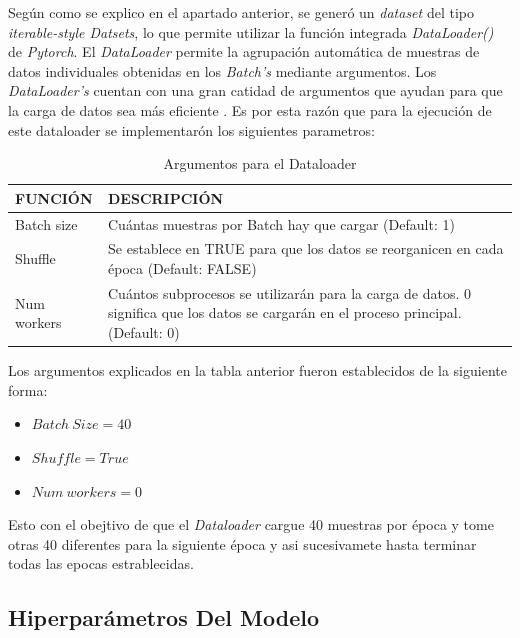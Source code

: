 			Según como se explico en el apartado anterior, se generó un \textit{dataset} del tipo \textit{iterable-style Datsets}, lo que permite utilizar la función integrada \textit{DataLoader()} de \textit{Pytorch}. El \textit{DataLoader} permite la agrupación automática de muestras de datos individuales obtenidas en los \textit{Batch's} mediante argumentos. Los \textit{DataLoader's} cuentan con una gran catidad de argumentos que ayudan para que la carga de datos sea más eficiente \cite{Pytorch}. Es por esta razón que para la ejecución de este dataloader se implementarón los siguientes parametros:
			
			\begin{table}[ht]
				\centering
				\begin{tabular}{|p{3cm}|p{8cm}|}
					\hline
					FUNCIÓN & DESCRIPCIÓN \\ 
					\hline
					Batch size & Cuántas muestras por Batch hay que cargar (Default: 1)\\
					\hline
					Shuffle & Se establece en TRUE para que los datos se reorganicen en cada época (Default: FALSE)  \\
					\hline
					Num workers & Cuántos subprocesos se utilizarán para la carga de datos. 0 significa que los datos se cargarán en el proceso principal. (Default: 0)\\
					\hline
				\end{tabular}	
				\caption{Argumentos para el Dataloader}
				\label{table:Argumentos}
			\end{table}
		
		Los argumentos explicados en la tabla anterior fueron establecidos de la siguiente forma:
		
		\begin{itemize}
			\item $Batch \ Size = 40$
			\item $Shuffle = True$
			\item $Num \ workers = 0$
		\end{itemize}

		Esto con el obejtivo de que el \textit{Dataloader} cargue 40 muestras por época y tome otras 40 diferentes para la siguiente época y asi sucesivamete hasta terminar todas las epocas estrablecidas.  
		
		
		
			
		
		\subsection{Hiperparámetros Del Modelo}
		
